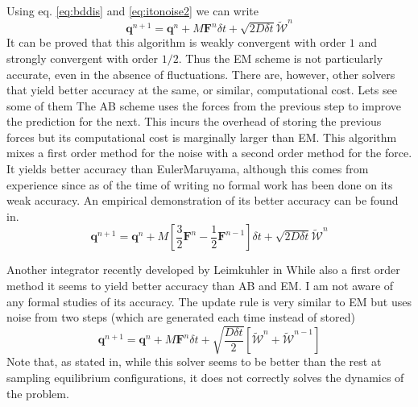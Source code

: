 \documentclass[ twoside,openright,titlepage,numbers=noenddot,%
headinclude,footinclude,cleardoublepage=empty,abstract=on,
BCOR=5mm,paper=a4,fontsize=11pt, dvipsnames
]{scrreprt}
\renewcommand{\vec}[1]{\bm{#1}}
\newcommand{\dt}{\delta t}
\newcommand{\half}{\frac{1}{2}}
\newcommand{\noise}{\widetilde{W}}
\newcommand{\ppos}{q}
\begin{document}
Using eq. \eqref{eq:bddis} and \eqref{eq:itonoise2} we can write
\begin{equation}
  \vec{\ppos}^{n+1} = \vec{\ppos}^n + M\vec{F}^n\dt + \sqrt{2D\dt}\vec{\mathcal{\noise}}^n
\end{equation}
It can be proved that this algorithm is weakly convergent with order $1$ and strongly convergent with order $1/2$\cite{Kloeden2011}. Thus the \gls{EM} scheme is not particularly accurate, even in the absence of fluctuations.
There are, however, other solvers that yield better accuracy at the same, or similar, computational cost. Lets see some of them
The \gls{AB} scheme uses the forces from the previous step to improve the prediction for the next. This incurs the overhead of storing the previous forces but its computational cost is marginally larger than \gls{EM}. This algorithm mixes a first order method for the noise with a second order method for the force. It yields better accuracy than EulerMaruyama, although this comes from experience since as of the time of writing no formal work has been done on its weak accuracy. An empirical demonstration of its better accuracy can be found in\cite{Balboa2017}.
\begin{equation}
  \vec{\ppos}^{n+1} = \vec{\ppos}^n + M\left[\frac{3}{2}\vec{F}^n - \half \vec{F}^{n-1}\right]\dt + \sqrt{2D\dt}\vec{\mathcal{\noise}}^n
\end{equation}

Another integrator recently developed by Leimkuhler in\cite{Leimkuhler2015}
 While also a first order method it seems to yield better accuracy than \gls{AB} and \gls{EM}. I am not aware of any formal studies of its accuracy.
 The update rule is very similar to \gls{EM} but uses noise from two steps (which are generated each time instead of stored)
 \begin{equation}
  \vec{\ppos}^{n+1} = \vec{\ppos}^n + M\vec{F}^n\dt + \sqrt{\frac{D\dt}{2}}\left[\vec{\mathcal{\noise}}^n + \vec{\mathcal{\noise}}^{n-1}\right]
\end{equation}
Note that, as stated in\cite{Leimkuhler2015}, while this solver seems to be better than the rest at sampling equilibrium configurations, it does not correctly solves the dynamics of the problem.
\end{document}
